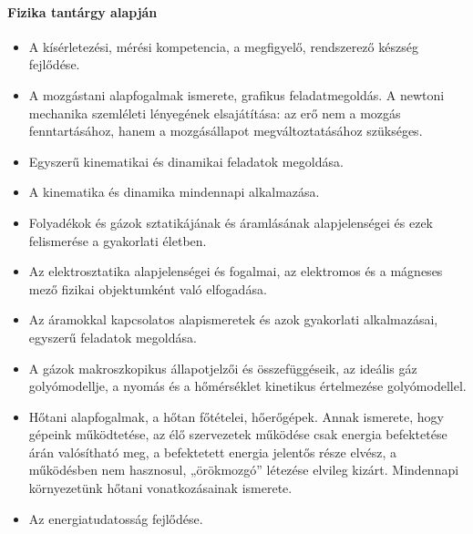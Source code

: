 \paragraph{Fizika tantárgy alapján}
\begin{itemize}
\item A kísérletezési, mérési kompetencia, a megfigyelő, rendszerező készség fejlődése.
\item A mozgástani alapfogalmak ismerete, grafikus feladatmegoldás. A newtoni mechanika szemléleti lényegének elsajátítása: az erő nem a mozgás fenntartásához, hanem a mozgásállapot megváltoztatásához szükséges.
\item Egyszerű kinematikai és dinamikai feladatok megoldása.
\item A kinematika és dinamika mindennapi alkalmazása.
\item Folyadékok és gázok sztatikájának és áramlásának alapjelenségei és ezek felismerése a gyakorlati életben.
\item Az elektrosztatika alapjelenségei és fogalmai, az elektromos és a mágneses mező fizikai objektumként való elfogadása.
\item Az áramokkal kapcsolatos alapismeretek és azok gyakorlati alkalmazásai, egyszerű feladatok megoldása.
\item A gázok makroszkopikus állapotjelzői és összefüggéseik, az ideális gáz golyómodellje, a nyomás és a hőmérséklet kinetikus értelmezése golyómodellel.
\item Hőtani alapfogalmak, a hőtan főtételei, hőerőgépek. Annak ismerete, hogy gépeink működtetése, az élő szervezetek működése csak energia befektetése árán valósítható meg, a befektetett energia jelentős része elvész, a működésben nem hasznosul, „örökmozgó” létezése elvileg kizárt.
  Mindennapi környezetünk hőtani vonatkozásainak ismerete.
\item Az energiatudatosság fejlődése.
\end{itemize}
